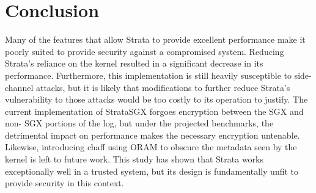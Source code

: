\documentclass[letterpaper,twocolumn,10pt]{article}
\providecommand{\todo}[1]{{\protect\color{red}\noindent {\bf [TODO]} \emph{#1} {\bf [/TODO]}}}
\begin{document}
\section{Conclusion}

Many of the features that allow Strata to provide excellent performance make it
poorly suited to provide security against a compromised system.  Reducing
Strata's reliance on the kernel resulted in a significant decrease in its
performance. Furthermore, this implementation is still heavily susceptible to
side- channel attacks, but it is likely that modifications to further reduce
Strata's vulnerability to those attacks would be too costly to its operation to
justify.  The current implementation of StrataSGX forgoes encryption between
the SGX and non- SGX portions of the log, but under the projected benchmarks,
the detrimental impact on performance makes the necessary encryption untenable.
Likewise, introducing chaff using ORAM to obscure the metadata seen by the
kernel is left to future work.  This study has shown that Strata works
exceptionally well in a trusted system, but its design is fundamentally unfit
to provide security in this context.

%
%

\newpage
\pagebreak

{\footnotesize 
}
\end{document}
